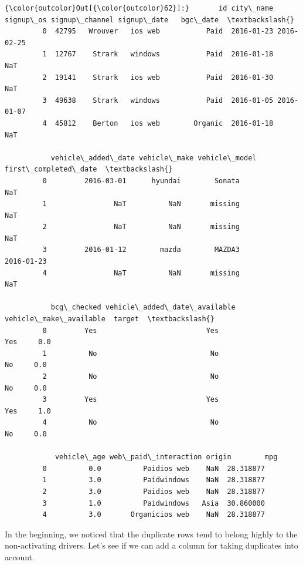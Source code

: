 \documentclass[11pt]{article}
\begin{document}
\begin{Verbatim}[commandchars=\\\{\}]
{\color{outcolor}Out[{\color{outcolor}62}]:}       id city\_name signup\_os signup\_channel signup\_date   bgc\_date  \textbackslash{}
         0  42795   Wrouver   ios web           Paid  2016-01-23 2016-02-25   
         1  12767    Strark   windows           Paid  2016-01-18        NaT   
         2  19141    Strark   ios web           Paid  2016-01-30        NaT   
         3  49638    Strark   windows           Paid  2016-01-05 2016-01-07   
         4  45812    Berton   ios web        Organic  2016-01-18        NaT   
         
           vehicle\_added\_date vehicle\_make vehicle\_model first\_completed\_date  \textbackslash{}
         0         2016-03-01      hyundai        Sonata                  NaT   
         1                NaT          NaN       missing                  NaT   
         2                NaT          NaN       missing                  NaT   
         3         2016-01-12        mazda        MAZDA3           2016-01-23   
         4                NaT          NaN       missing                  NaT   
         
           bcg\_checked vehicle\_added\_date\_available vehicle\_make\_available  target  \textbackslash{}
         0         Yes                          Yes                    Yes     0.0   
         1          No                           No                     No     0.0   
         2          No                           No                     No     0.0   
         3         Yes                          Yes                    Yes     1.0   
         4          No                           No                     No     0.0   
         
            vehicle\_age web\_paid\_interaction origin        mpg  
         0          0.0          Paidios web    NaN  28.318877  
         1          3.0          Paidwindows    NaN  28.318877  
         2          3.0          Paidios web    NaN  28.318877  
         3          1.0          Paidwindows   Asia  30.860000  
         4          3.0       Organicios web    NaN  28.318877  
\end{Verbatim}
            
    In the beginning, we noticed that the duplicate rows tend to belong
highly to the non-activating drivers. Let's see if we can add a column
for taking duplicates into account.
\end{document}
